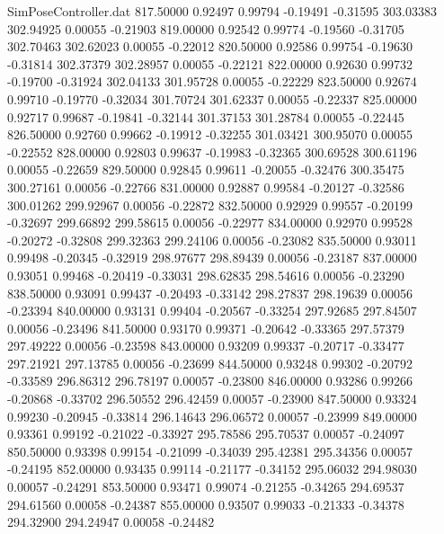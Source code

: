 \begin{filecontents}{SimPoseController.dat}
 817.50000    0.92497    0.99794    -0.19491   -0.31595  303.03383  302.94925    0.00055   -0.21903
 819.00000    0.92542    0.99774    -0.19560   -0.31705  302.70463  302.62023    0.00055   -0.22012
 820.50000    0.92586    0.99754    -0.19630   -0.31814  302.37379  302.28957    0.00055   -0.22121
 822.00000    0.92630    0.99732    -0.19700   -0.31924  302.04133  301.95728    0.00055   -0.22229
 823.50000    0.92674    0.99710    -0.19770   -0.32034  301.70724  301.62337    0.00055   -0.22337
 825.00000    0.92717    0.99687    -0.19841   -0.32144  301.37153  301.28784    0.00055   -0.22445
 826.50000    0.92760    0.99662    -0.19912   -0.32255  301.03421  300.95070    0.00055   -0.22552
 828.00000    0.92803    0.99637    -0.19983   -0.32365  300.69528  300.61196    0.00055   -0.22659
 829.50000    0.92845    0.99611    -0.20055   -0.32476  300.35475  300.27161    0.00056   -0.22766
 831.00000    0.92887    0.99584    -0.20127   -0.32586  300.01262  299.92967    0.00056   -0.22872
 832.50000    0.92929    0.99557    -0.20199   -0.32697  299.66892  299.58615    0.00056   -0.22977
 834.00000    0.92970    0.99528    -0.20272   -0.32808  299.32363  299.24106    0.00056   -0.23082
 835.50000    0.93011    0.99498    -0.20345   -0.32919  298.97677  298.89439    0.00056   -0.23187
 837.00000    0.93051    0.99468    -0.20419   -0.33031  298.62835  298.54616    0.00056   -0.23290
 838.50000    0.93091    0.99437    -0.20493   -0.33142  298.27837  298.19639    0.00056   -0.23394
 840.00000    0.93131    0.99404    -0.20567   -0.33254  297.92685  297.84507    0.00056   -0.23496
 841.50000    0.93170    0.99371    -0.20642   -0.33365  297.57379  297.49222    0.00056   -0.23598
 843.00000    0.93209    0.99337    -0.20717   -0.33477  297.21921  297.13785    0.00056   -0.23699
 844.50000    0.93248    0.99302    -0.20792   -0.33589  296.86312  296.78197    0.00057   -0.23800
 846.00000    0.93286    0.99266    -0.20868   -0.33702  296.50552  296.42459    0.00057   -0.23900
 847.50000    0.93324    0.99230    -0.20945   -0.33814  296.14643  296.06572    0.00057   -0.23999
 849.00000    0.93361    0.99192    -0.21022   -0.33927  295.78586  295.70537    0.00057   -0.24097
 850.50000    0.93398    0.99154    -0.21099   -0.34039  295.42381  295.34356    0.00057   -0.24195
 852.00000    0.93435    0.99114    -0.21177   -0.34152  295.06032  294.98030    0.00057   -0.24291
 853.50000    0.93471    0.99074    -0.21255   -0.34265  294.69537  294.61560    0.00058   -0.24387
 855.00000    0.93507    0.99033    -0.21333   -0.34378  294.32900  294.24947    0.00058   -0.24482

\end{filecontents}
